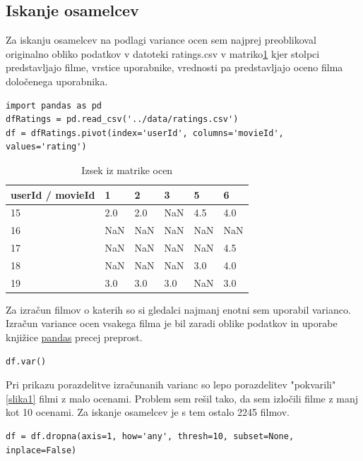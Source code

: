 \documentclass[a4paper,11pt]{article}
\begin{document}
\subsection{Iskanje osamelcev}
Za iskanju osamelcev na podlagi variance ocen sem najprej preoblikoval
originalno obliko podatkov v datoteki ratings.csv v matriko\ref{tab2} kjer stolpci
predstavljajo filme, vrstice uporabnike, vrednosti pa predstavljajo oceno
filma določenega uporabnika.

\begin{lstlisting}
import pandas as pd
dfRatings = pd.read_csv('../data/ratings.csv')
df = dfRatings.pivot(index='userId', columns='movieId', values='rating')
\end{lstlisting}

\begin{table}[htbp]
\caption{Izsek iz matrike ocen}
\label{tab2}
\begin{center}
\begin{tabular}{lllllp{2cm}}
\hline
userId / movieId & 1 & 2 & 3 & 5 & 6 \\
\hline
15 & 2.0 & 2.0 & NaN & 4.5 & 4.0 \\
16 & NaN & NaN & NaN & NaN & NaN \\
17 & NaN & NaN & NaN & NaN & 4.5 \\
18 & NaN & NaN & NaN & 3.0 & 4.0 \\
19 & 3.0 & 3.0 & 3.0 & NaN & 3.0 \\
\hline
\end{tabular}
\end{center}
\end{table}

Za izračun filmov o katerih so si gledalci najmanj enotni sem uporabil varianco. Izračun variance ocen vsakega filma je bil zaradi oblike podatkov in uporabe knjižice \href{http://pandas.pydata.org/index.html}{pandas} precej preprost.

\begin{lstlisting}
df.var()
\end{lstlisting}

Pri prikazu porazdelitve izračunanih varianc so lepo porazdelitev "pokvarili"\ref{slika1}\hspace{0cm} filmi z malo ocenami. Problem sem rešil tako, da sem izločili filme z manj kot 10 ocenami. Za iskanje osamelcev je s tem ostalo 2245 filmov.

\begin{lstlisting}
df = df.dropna(axis=1, how='any', thresh=10, subset=None, inplace=False)
\end{lstlisting}
\end{document}
